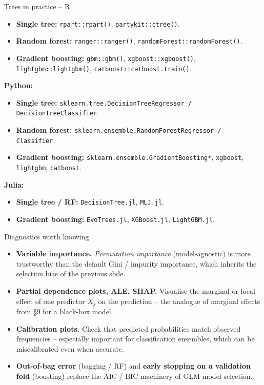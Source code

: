 \documentclass[10pt,ignorenonframetext,aspectratio=169]{beamer}
\begin{document}
\begin{frame}{Trees in practice -- R}
\begin{itemize}
    \justifying
    \item \textbf{Single tree:} \texttt{rpart::rpart()}, \texttt{partykit::ctree()}.
    \item \textbf{Random forest:} \texttt{ranger::ranger()}, \texttt{randomForest::randomForest()}.
    \item \textbf{Gradient boosting:} \texttt{gbm::gbm()}, \texttt{xgboost::xgboost()}, \texttt{lightgbm::lightgbm()}, \texttt{catboost::catboost.train()}.
\end{itemize}

\medskip
\textbf{Python:}
\begin{itemize}
    \justifying
    \item \textbf{Single tree:} \texttt{sklearn.tree.DecisionTreeRegressor / DecisionTreeClassifier}.
    \item \textbf{Random forest:} \texttt{sklearn.ensemble.RandomForestRegressor / Classifier}.
    \item \textbf{Gradient boosting:} \texttt{sklearn.ensemble.GradientBoosting*}, \texttt{xgboost}, \texttt{lightgbm}, \texttt{catboost}.
\end{itemize}

\medskip
\textbf{Julia:}
\begin{itemize}
    \justifying
    \item \textbf{Single tree / RF:} \texttt{DecisionTree.jl}, \texttt{MLJ.jl}.
    \item \textbf{Gradient boosting:} \texttt{EvoTrees.jl}, \texttt{XGBoost.jl}, \texttt{LightGBM.jl}.
\end{itemize}
\end{frame}


\begin{frame}{Diagnostics worth knowing}
\begin{itemize}
    \justifying
    \item \textbf{Variable importance.} \emph{Permutation importance} (model-agnostic) is more trustworthy than the default Gini / impurity importance, which inherits the selection bias of the previous slide.
    \item \textbf{Partial dependence plots, ALE, SHAP.} Visualise the marginal or local effect of one predictor $X_j$ on the prediction -- the analogue of marginal effects from \S 9 for a black-box model.
    \item \textbf{Calibration plots.} Check that predicted probabilities match observed frequencies -- especially important for classification ensembles, which can be miscalibrated even when accurate.
    \item \textbf{Out-of-bag error} (bagging / RF) and \textbf{early stopping on a validation fold} (boosting) replace the AIC / BIC machinery of GLM model selection.
\end{itemize}
\end{frame}
\end{document}
